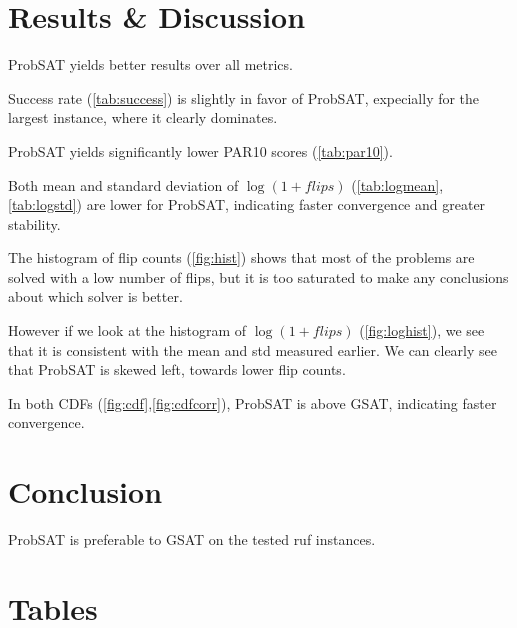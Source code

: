 \documentclass[11pt]{article}
\begin{document}
\section{Results \& Discussion}
ProbSAT yields better results over all metrics.

Success rate (\autoref{tab:success}) is slightly in favor of ProbSAT, expecially for the largest instance, where it clearly dominates.

ProbSAT yields significantly lower PAR10 scores (\autoref{tab:par10}).

Both mean and standard deviation of $\log(1+flips)$ (\autoref{tab:logmean}, \autoref{tab:logstd}) are lower for ProbSAT,
indicating faster convergence and greater stability.

The histogram of flip counts (\autoref{fig:hist}) shows that most of the problems are solved with a low number of flips,
but it is too saturated to make any conclusions about which solver is better.

However if we look at the histogram of $\log(1+flips)$ (\autoref{fig:loghist}),
we see that it is consistent with the mean and std measured earlier. We can clearly
see that ProbSAT is skewed left, towards lower flip counts.

In both CDFs (\autoref{fig:cdf},\autoref{fig:cdfcorr}), ProbSAT is above GSAT, indicating faster convergence.

\section{Conclusion}
ProbSAT is preferable to GSAT on the tested ruf instances.

\newpage
\section*{Tables}
\end{document}
